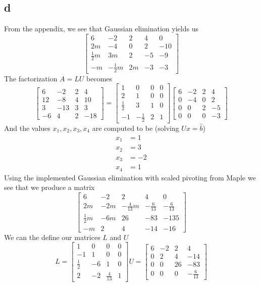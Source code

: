 \documentclass[12pt]{article}
\begin{document}
\subsection*{d}
From the appendix, we see that Gaussian elimination yields us
$$
\begin{bmatrix}
6 & -2 & 2 & 4 & 0\\
2m & -4 & 0 & 2 & -10\\
\frac{1}{2}m & 3m & 2 & -5 & -9 \\
-m & -\frac{1}{2}m & 2m & -3 & -3
\end{bmatrix}
$$
The factorization $A=LU$ becomes
$$
\begin{bmatrix}
6 & -2 & 2 & 4\\
12 & -8 & 4 & 10 \\
3 & -13 & 3 & 3 \\
-6 & 4 & 2 & -18
\end{bmatrix}
=
\begin{bmatrix}
1 & 0 & 0 & 0\\
2 & 1 & 0 & 0 \\
\frac{1}{2} & 3 & 1 & 0 \\
-1 & -\frac{1}{2} & 2 & 1
\end{bmatrix}
\begin{bmatrix}
6 & -2 & 2 & 4\\
0 & -4 & 0 & 2 \\
0 & 0 & 2 & -5 \\
0 & 0 & 0 & -3
\end{bmatrix}
$$
And the values $x_1,x_2,x_3,x_4$ are computed to be (solving $Ux=\hat{b}$)
\begin{align*}
x_1&=1 \\
x_2&=3 \\
x_3&=-2 \\
x_4&=1
\end{align*}
Using the implemented Gaussian elimination with scaled pivoting from Maple we see that we produce a matrix
$$
\begin{bmatrix}
6 & -2 & 2 & 4 & 0 \\
2m & -2m & -\frac{4}{13}m & -\frac{6}{13} & -\frac{6}{13}\\
\frac{1}{2}m & -6m & 26 & -83 & -135 \\
-m & 2 & 4 & -14 & -16
\end{bmatrix}
$$
We can the define our matrices $L$ and $U$
$$
L
=
\begin{bmatrix}
1 & 0 & 0 & 0\\
-1 & 1 & 0 & 0 \\
\frac{1}{2} & -6 & 1 & 0 \\
2 & -2 & \frac{4}{13} & 1
\end{bmatrix}
U
=
\begin{bmatrix}
6 & -2 & 2 & 4\\
0 & 2 & 4 & -14 \\
0 & 0 & 26 & -83 \\
0 & 0 & 0 & -\frac{6}{13}
\end{bmatrix}
$$
\end{document}
